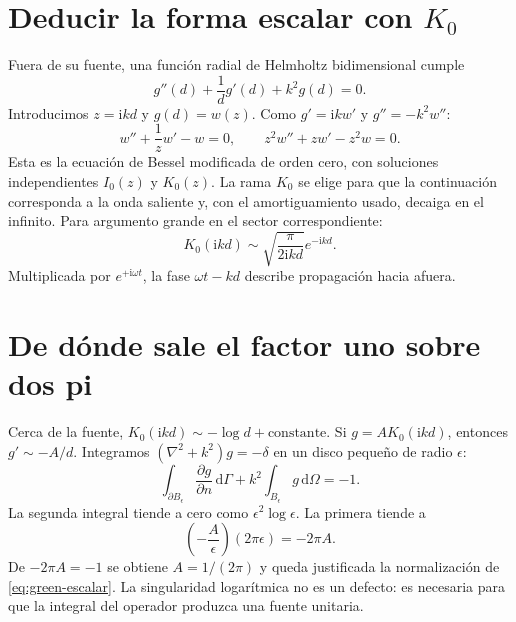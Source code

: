 \documentclass[11pt,a4paper]{report}
\numberwithin{equation}{chapter}
\newcommand{\dd}{\,\mathrm{d}}
\newcommand{\ii}{\mathrm{i}}
\begin{document}
\section{Deducir la forma escalar con \texorpdfstring{$K_0$}{K0}}
Fuera de su fuente, una funci\'on radial de Helmholtz bidimensional cumple
\begin{equation}
 g''(d)+\frac1d g'(d)+k^2g(d)=0.
\end{equation}
Introducimos $z=\ii kd$ y $g(d)=w(z)$. Como
$g'=\ii k w'$ y $g''=-k^2w''$:
\begin{equation}
 w''+\frac1z w'-w=0,\qquad
 z^2w''+zw'-z^2w=0.
\end{equation}
Esta es la ecuaci\'on de Bessel modificada de orden cero, con
soluciones independientes $I_0(z)$ y $K_0(z)$.
La rama $K_0$ se elige para que la continuaci\'on corresponda a
la onda saliente y, con el amortiguamiento usado, decaiga en el infinito.
Para argumento grande en el sector correspondiente:
\begin{equation}
 K_0(\ii kd)\sim
 \sqrt{\frac{\pi}{2\ii kd}}e^{-\ii kd}.
\end{equation}
Multiplicada por $e^{+\ii\omega t}$, la fase
$\omega t-kd$ describe propagaci\'on hacia afuera.

\section{De d\'onde sale el factor uno sobre dos pi}
Cerca de la fuente, $K_0(\ii kd)\sim-\log d+\text{constante}$.
Si $g=A K_0(\ii kd)$, entonces $g'\sim-A/d$.
Integramos $(\nabla^2+k^2)g=-\delta$ en un disco peque\~no
de radio $\epsilon$:
\begin{equation}
 \int_{\partial B_\epsilon}\frac{\partial g}{\partial n}\dd\Gamma
 +k^2\int_{B_\epsilon}g\dd\Omega=-1.
\end{equation}
La segunda integral tiende a cero como
$\epsilon^2\log\epsilon$. La primera tiende a
\begin{equation}
 \left(-\frac{A}{\epsilon}\right)(2\pi\epsilon)=-2\pi A.
\end{equation}
De $-2\pi A=-1$ se obtiene $A=1/(2\pi)$ y queda justificada
la normalizaci\'on de \eqref{eq:green-escalar}.
La singularidad logar\'itmica no es un defecto: es necesaria para que
la integral del operador produzca una fuente unitaria.
\end{document}
